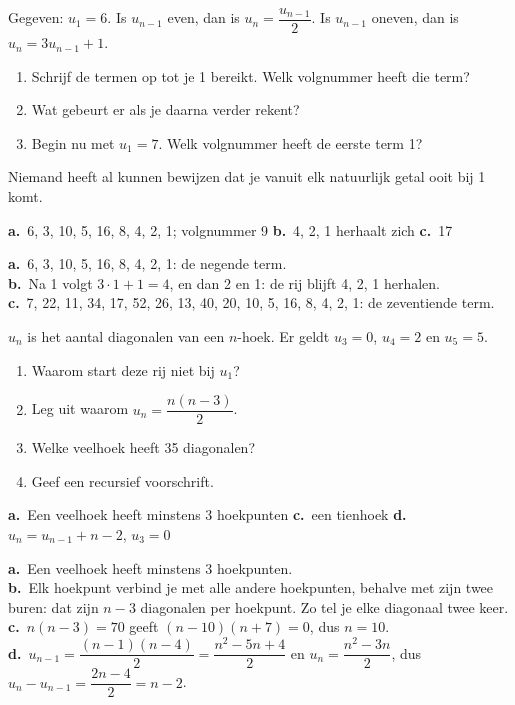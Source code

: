 \begin{oefeningen}
\begin{oefening}[2]
Gegeven: $u_1 = 6$. Is $u_{n-1}$ even, dan is $u_n = \dfrac{u_{n-1}}{2}$. Is $u_{n-1}$ oneven, dan is $u_n = 3u_{n-1} + 1$.
\begin{enumerate}
  \item Schrijf de termen op tot je 1 bereikt. Welk volgnummer heeft die term?
  \item Wat gebeurt er als je daarna verder rekent?
  \item Begin nu met $u_1 = 7$. Welk volgnummer heeft de eerste term 1?
\end{enumerate}
Niemand heeft al kunnen bewijzen dat je vanuit elk natuurlijk getal ooit bij 1 komt.
\begin{solution}
\textbf{a.}~6, 3, 10, 5, 16, 8, 4, 2, 1; volgnummer 9 \quad \textbf{b.}~4, 2, 1 herhaalt zich \quad \textbf{c.}~17
\end{solution}
\begin{fullsolution}
\textbf{a.}~6, 3, 10, 5, 16, 8, 4, 2, 1: de negende term.\\
\textbf{b.}~Na 1 volgt $3\cdot 1+1=4$, en dan 2 en 1: de rij blijft 4, 2, 1 herhalen.\\
\textbf{c.}~7, 22, 11, 34, 17, 52, 26, 13, 40, 20, 10, 5, 16, 8, 4, 2, 1: de zeventiende term.
\end{fullsolution}
\end{oefening}

\begin{oefening}[2]
$u_n$ is het aantal diagonalen van een $n$-hoek. Er geldt $u_3 = 0$, $u_4 = 2$ en $u_5 = 5$.
\begin{enumerate}
  \item Waarom start deze rij niet bij $u_1$?
  \item Leg uit waarom $u_n = \dfrac{n(n-3)}{2}$.
  \item Welke veelhoek heeft 35 diagonalen?
  \item Geef een recursief voorschrift.
\end{enumerate}
\begin{solution}
\textbf{a.}~Een veelhoek heeft minstens 3 hoekpunten \quad \textbf{c.}~een tienhoek \quad \textbf{d.}~$u_n=u_{n-1}+n-2$, $u_3=0$
\end{solution}
\begin{fullsolution}
\textbf{a.}~Een veelhoek heeft minstens 3 hoekpunten.\\
\textbf{b.}~Elk hoekpunt verbind je met alle andere hoekpunten, behalve met zijn twee buren: dat zijn $n-3$ diagonalen per hoekpunt. Zo tel je elke diagonaal twee keer.\\
\textbf{c.}~$n(n-3)=70$ geeft $(n-10)(n+7)=0$, dus $n=10$.\\
\textbf{d.}~$u_{n-1}=\dfrac{(n-1)(n-4)}{2}=\dfrac{n^2-5n+4}{2}$ en $u_n=\dfrac{n^2-3n}{2}$, dus $u_n-u_{n-1}=\dfrac{2n-4}{2}=n-2$.
\end{fullsolution}
\end{oefening}


\end{oefeningen}
